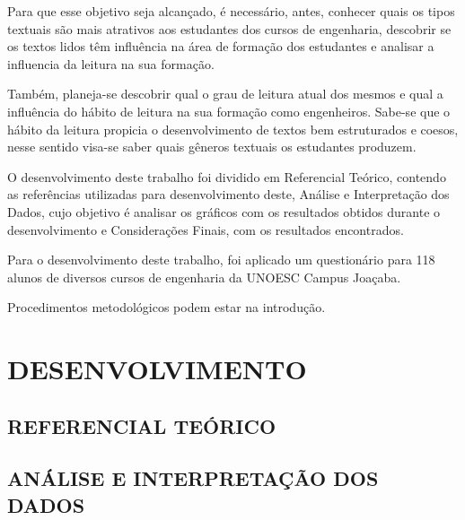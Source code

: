 \documentclass[
	article,			%
	11pt,				%
	oneside,			%
	a4paper,			%
	english,			%
	brazil,				%
	sumario=tradicional
	]{abntex2}
\begin{document}
Para que esse objetivo seja alcançado, é necessário, antes, conhecer quais os tipos textuais são mais atrativos aos estudantes dos cursos de engenharia, descobrir se os textos lidos têm influência na área de formação dos estudantes e analisar a influencia da leitura na sua formação.

Também, planeja-se descobrir qual o grau de leitura atual dos mesmos e qual a influência do hábito de leitura na sua formação como engenheiros. Sabe-se que o hábito da leitura propicia o desenvolvimento de textos bem estruturados e coesos, nesse sentido visa-se saber quais gêneros textuais os estudantes produzem.

O desenvolvimento deste trabalho foi dividido em Referencial Teórico, contendo as referências utilizadas para desenvolvimento deste, Análise e Interpretação dos Dados, cujo objetivo é analisar os gráficos com os resultados obtidos durante o desenvolvimento e Considerações Finais, com os resultados encontrados.

Para o desenvolvimento deste trabalho, foi aplicado um questionário para 118 alunos de diversos cursos de engenharia da UNOESC Campus Joaçaba. 

Procedimentos metodológicos podem estar na introdução.


\section{DESENVOLVIMENTO}

\subsection{REFERENCIAL TEÓRICO}


\subsection{ANÁLISE E INTERPRETAÇÃO DOS DADOS}

% 

\end{document}

